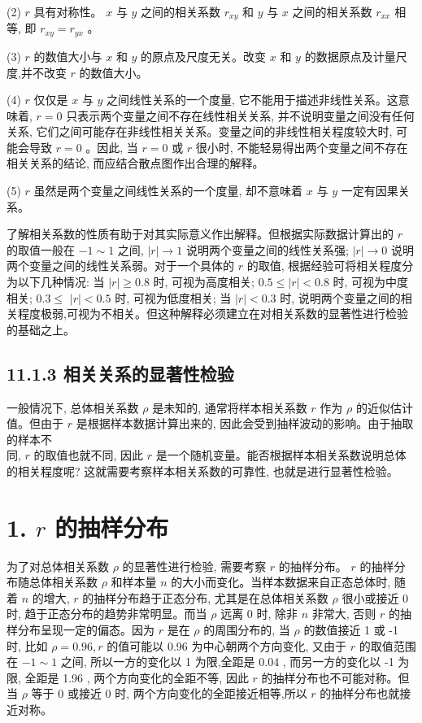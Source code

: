 \documentclass[10pt]{article}
\begin{document}
\begin{CJK*}{UTF8}{bsmi}
(2) $r$ 具有对称性。 $x$ 与 $y$ 之间的相关系数 $r_{x y}$ 和 $y$ 与 $x$ 之间的相关系数 $r_{x x}$ 相等, 即 $r_{x y}=r_{y x}$ 。

(3) $r$ 的数值大小与 $x$ 和 $y$ 的原点及尺度无关。改变 $x$ 和 $y$ 的数据原点及计量尺度,并不改变 $r$ 的数值大小。

(4) $r$ 仅仅是 $x$ 与 $y$ 之间线性关系的一个度量, 它不能用于描述非线性关系。这意味着, $r=0$ 只表示两个变量之间不存在线性相关关系, 并不说明变量之间没有任何关系, 它们之间可能存在非线性相关关系。变量之间的非线性相关程度较大时, 可能会导致 $r=0$ 。因此, 当 $r=0$ 或 $r$ 很小时, 不能轻易得出两个变量之间不存在相关关系的结论, 而应结合散点图作出合理的解释。

(5) $r$ 虽然是两个变量之间线性关系的一个度量, 却不意味着 $x$ 与 $y$ 一定有因果关系。

了解相关系数的性质有助于对其实际意义作出解释。但根据实际数据计算出的 $r$ 的取值一般在 $-1 \sim 1$ 之间, $|r| \rightarrow 1$ 说明两个变量之间的线性关系强; $|r| \rightarrow 0$ 说明两个变量之间的线性关系弱。对于一个具体的 $r$ 的取值, 根据经验可将相关程度分为以下几种情况: 当 $|r| \geqslant 0.8$ 时, 可视为高度相关; $0.5 \leqslant|r|<0.8$ 时, 可视为中度相关; $0.3 \leqslant$ $|r|<0.5$ 时, 可视为低度相关; 当 $|r|<0.3$ 时, 说明两个变量之间的相关程度极弱,可视为不相关。但这种解释必须建立在对相关系数的显著性进行检验的基础之上。

\subsection*{11.1.3 相关关系的显著性检验}
一般情况下, 总体相关系数 $\rho$ 是未知的, 通常将样本相关系数 $r$ 作为 $\rho$ 的近似估计值。但由于 $r$ 是根据样本数据计算出来的, 因此会受到抽样波动的影响。由于抽取的样本不\\
同, $r$ 的取值也就不同, 因此 $r$ 是一个随机变量。能否根据样本相关系数说明总体的相关程度呢? 这就需要考察样本相关系数的可靠性, 也就是进行显著性检验。

\section*{1. $r$ 的抽样分布}
为了对总体相关系数 $\rho$ 的显著性进行检验, 需要考察 $r$ 的抽样分布。 $r$ 的抽样分布随总体相关系数 $\rho$ 和样本量 $n$ 的大小而变化。当样本数据来自正态总体时, 随着 $n$ 的增大, $r$ 的抽样分布趋于正态分布, 尤其是在总体相关系数 $\rho$ 很小或接近 0 时, 趋于正态分布的趋势非常明显。而当 $\rho$ 远离 0 时, 除非 $n$ 非常大, 否则 $r$ 的抽样分布呈现一定的偏态。因为 $r$ 是在 $\rho$ 的周围分布的, 当 $\rho$ 的数值接近 1 或 -1 时, 比如 $\rho=0.96, r$ 的值可能以 0.96 为中心朝两个方向变化, 又由于 $r$ 的取值范围在 $-1 \sim 1$ 之间, 所以一方的变化以 1 为限,全距是 0.04 , 而另一方的变化以 -1 为限, 全距是 1.96 , 两个方向变化的全距不等, 因此 $r$ 的抽样分布也不可能对称。但当 $\rho$ 等于 0 或接近 0 时, 两个方向变化的全距接近相等,所以 $r$ 的抽样分布也就接近对称。


\end{CJK*}
\end{document}
